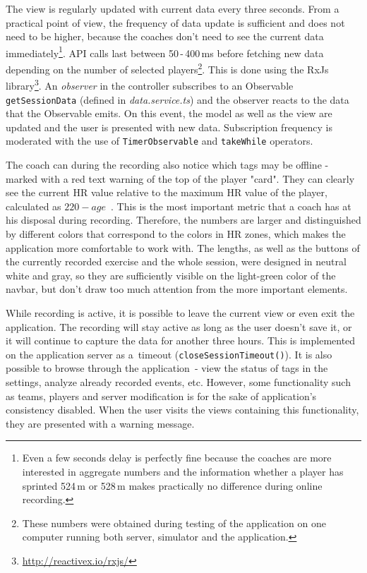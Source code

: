 The view is regularly updated with current data every three seconds. From a practical point of view, the frequency of data update is sufficient and does not need to be higher, because the coaches don’t need to see the current data immediately\footnote{Even a few seconds delay is perfectly fine because the coaches are more interested in aggregate numbers and the information whether a player has sprinted 524\,m or 528\,m makes practically no difference during online recording.}. API calls last between 50\,-\,400\,ms before fetching new data depending on the number of selected players\footnote{These numbers were obtained during testing of the application on one computer running both server, simulator and the application.}. This is done using the RxJs library\footnote{\url{http://reactivex.io/rxjs/}}. An \textit{observer} in the controller subscribes to an Observable \texttt{getSessionData} (defined in \textit{data.service.ts}) and the observer reacts to the data that the Observable emits. On this event, the model as well as the view are updated and the user is presented with new data. Subscription frequency is moderated with the use of \texttt{TimerObservable} and \texttt{takeWhile} operators.

The coach can during the recording also notice which tags may be offline - marked with a red text warning of the top of the player "card". They can clearly see the current HR value relative to the maximum HR value of the player, calculated as \(220 - age\)~\cite{HRmax}. This is the most important metric that a coach has at his disposal during recording. Therefore, the numbers are larger and distinguished by different colors that correspond to the colors in HR zones, which makes the application more comfortable to work with. The lengths, as well as the buttons of the currently recorded exercise and the whole session, were designed in neutral white and gray, so they are sufficiently visible on the light-green color of the navbar, but don’t draw too much attention from the more important elements.

While recording is active, it is possible to leave the current view or even exit the application. The recording will stay active as long as the user doesn’t save it, or it will continue to capture the data for another three hours. This is implemented on the application server as a~timeout (\texttt{closeSessionTimeout()}). It is also possible to browse through the application~- view the status of tags in the settings, analyze already recorded events, etc. However, some functionality such as teams, players and server modification is for the sake of application’s consistency disabled. When the user visits the views containing this functionality, they are presented with a warning message.

